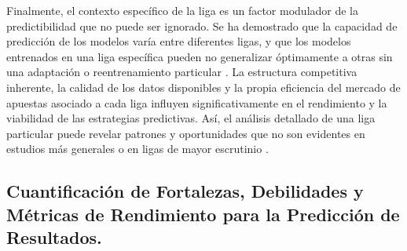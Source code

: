 Finalmente, el contexto específico de la liga es un factor modulador de la predictibilidad que no puede ser ignorado.
Se ha demostrado que la capacidad de predicción de los modelos varía entre diferentes ligas, y que los modelos entrenados en una liga específica pueden no generalizar óptimamente a otras sin una adaptación o reentrenamiento particular \cite{Malamatinos2022GreekLeague}.
La estructura competitiva inherente, la calidad de los datos disponibles y la propia eficiencia del mercado de apuestas asociado a cada liga influyen significativamente en el rendimiento y la viabilidad de las estrategias predictivas. Así, el análisis detallado de una liga particular puede revelar patrones y oportunidades que no son evidentes en estudios más generales o en ligas de mayor escrutinio \cite{Beretta2023OptimalAlgorithmTournaments}.


\subsection{Cuantificación de Fortalezas, Debilidades y Métricas de Rendimiento para la Predicción de Resultados.}


